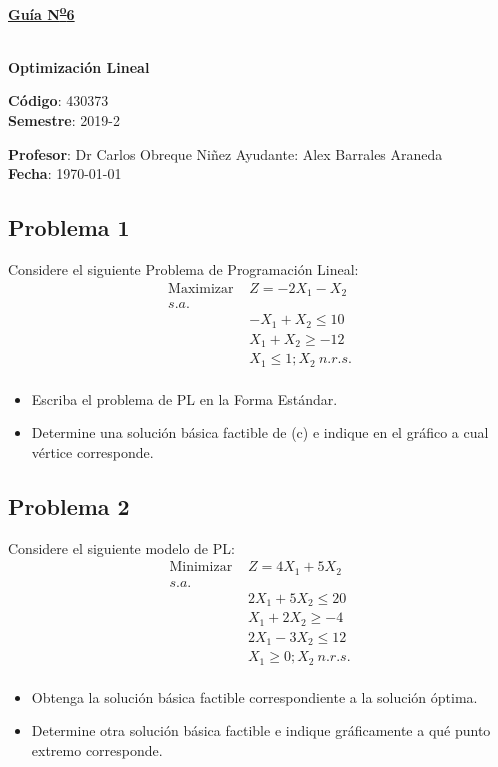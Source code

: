 \documentclass[letterpaper]{article}
\begin{document}
\vspace*{0.5\baselineskip}
\begin{center}
\begin{Large}
\textbf{\underline{Guía N\textsuperscript{\underline{o}}6}}
\end{Large}\\
\vspace*{0.5\baselineskip}
\textbf{Optimización Lineal} \\
\vspace*{0.5\baselineskip}
\begin{footnotesize}
\textbf{Código}: 430373\\
\textbf{Semestre}: 2019-2
\end{footnotesize}
\end{center}

\noindent \textbf{Profesor}: Dr Carlos Obreque Niñez  \hfill Ayudante: Alex Barrales Araneda\\
\noindent \textbf{Fecha}: \today

\subsection*{Problema 1}
Considere el siguiente Problema de Programación Lineal:
\begin{align*}
\mbox{Maximizar }&Z = -2X_1 - X_2\\
s.a.\\
&-X_1 + X_2 \leq 10\\
&X_1 + X_2 \geq -12\\
&X_1 \leq 1 ; X_2\: n.r.s.\\
\end{align*}

\begin{itemize}
\item Escriba el problema de PL en la Forma Estándar.
\item Determine una solución básica factible de (c) e indique en el gráfico a cual vértice corresponde.
\end{itemize}

\subsection*{Problema 2}
Considere el siguiente modelo de PL:
\begin{align*}
\mbox{Minimizar }&Z = 4X_1 + 5X_2\\
s.a.\\
&2X_1 + 5X_2 \leq 20\\
&X_1 + 2X_2 \geq -4\\
&2X_1 - 3X_2 \leq 12\\
&X_1 \geq 0 ; X_2\: n.r.s.\\
\end{align*}
\begin{itemize}
\item Obtenga la solución básica factible correspondiente a la solución óptima.
\item Determine otra solución básica factible e indique gráficamente a qué punto extremo corresponde.
\end{itemize}
\end{document}
